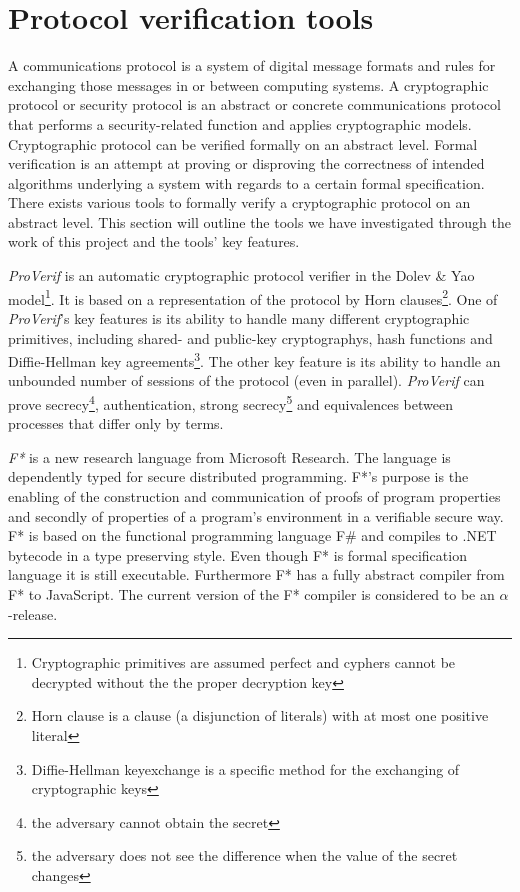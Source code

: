 \documentclass[twosided]{report}
\begin{document}
\section{Protocol verification tools}
A communications protocol is a system of digital message formats and rules for exchanging those messages in or between computing systems. A cryptographic protocol or security protocol is an abstract or concrete communications protocol that performs a security-related function and applies cryptographic models. Cryptographic protocol can be verified formally on an abstract level. Formal verification is an attempt at proving or disproving the correctness of intended algorithms underlying a system with regards to a certain formal specification. There exists various tools to formally verify a cryptographic protocol on an abstract level. This section will outline the tools we have investigated through the work of this project and the tools' key features.
\par
\emph{ProVerif} \cite{proverif} is an automatic cryptographic protocol verifier in the Dolev \& Yao model\footnote{Cryptographic primitives are assumed perfect and cyphers cannot be decrypted without the the proper decryption key}. It is based on a representation of the protocol by Horn clauses\footnote{Horn clause is a clause (a disjunction of literals) with at most one positive literal}. One of \emph{ProVerif}'s key features is its ability to handle many different cryptographic primitives, including shared- and public-key cryptographys, hash functions and Diffie-Hellman key agreements\footnote{Diffie-Hellman keyexchange is a specific method for the exchanging of cryptographic keys}. The other key feature is its ability to handle an unbounded number of sessions of the protocol (even in parallel). \emph{ProVerif} can prove secrecy\footnote{the adversary cannot obtain the secret}, authentication, strong secrecy\footnote{the adversary does not see the difference when the value of the secret changes} and equivalences between processes that differ only by terms.
\par
\emph{F*} \cite{fstar-msr} is a new research language from Microsoft Research. The language is dependently typed for secure distributed programming. F*'s purpose is the enabling of the construction and communication of proofs of program properties and secondly of properties of a program's environment in a verifiable secure way. F* is based on the functional programming language F\# and compiles to .NET bytecode in a type preserving style. Even though F* is formal specification language it is still executable. Furthermore F* has a fully abstract compiler from F* to JavaScript. The current version of the F* compiler is considered to be an $\alpha$-release.
\end{document}
